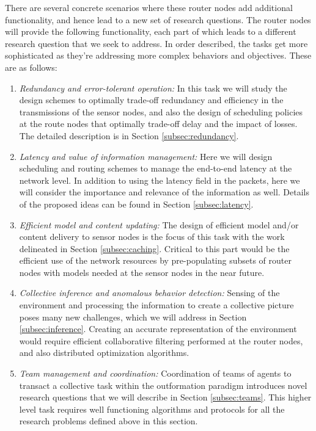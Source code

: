 \documentclass[12pt,letterpaper]{article}
\begin{document}
There are several concrete scenarios where these router nodes add additional functionality, and hence lead to a new set of research questions. The router nodes will provide the following functionality, each part of which leads to a different research question that we seek to address. In order described, the tasks get more sophisticated as they're addressing more complex behaviors and objectives. These are as follows:
\begin{enumerate}
    \item \textit{Redundancy and error-tolerant operation: }In this task we will study the design schemes to optimally trade-off redundancy and efficiency in the transmissions of the sensor nodes, and also the design of scheduling policies at the route nodes that optimally trade-off delay and the impact of losses. The detailed description is in Section \ref{subsec:redundancy}.
    \item \textit{Latency and value of information management: }Here we will design scheduling and routing schemes to manage the end-to-end latency at the network level. In addition to using the latency field in the packets, here we will consider the importance and relevance of the information as well. Details of the proposed ideas can be found in Section \ref{subsec:latency}.
    \item \textit{Efficient model and content updating: }The design of efficient model and/or content delivery to sensor nodes is the focus of this task with the work delineated in Section \ref{subsec:caching}. Critical to this part would be the efficient use of the network resources by pre-populating subsets of router nodes with models needed at the sensor nodes in the near future.
    \item \textit{Collective inference and anomalous behavior detection: }Sensing of the environment and processing the information to create a collective picture poses many new challenges, which we will address in Section \ref{subsec:inference}. Creating an accurate representation of the environment would require efficient collaborative filtering performed at the router nodes, and also distributed optimization algorithms.
    \item \textit{Team management and coordination: }Coordination of teams of agents to transact a collective task within the outformation paradigm introduces novel research questions that we will describe in Section \ref{subsec:teams}. This higher level task requires well functioning algorithms and protocols for all the research problems defined above in this section.
\end{enumerate}
\end{document}
